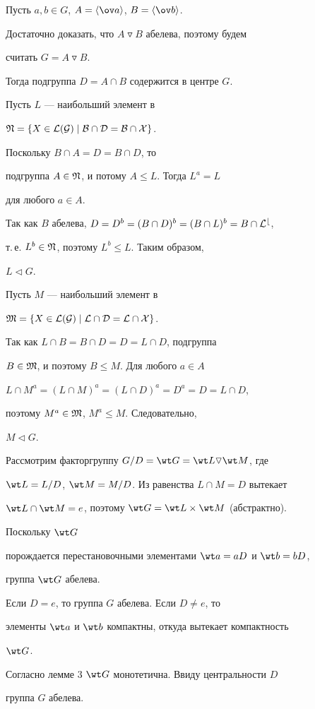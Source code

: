  


\begin{pf} Пусть $a,b\in G$, $A=\la\ov a\ra$, $B=\la\ov b\ra$. 


Достаточно доказать, что $A\triangledown B$ абелева, поэтому будем 


считать $G=A\triangledown B$. 


Тогда подгруппа $D=A\cap B$ содержится в центре $G$. 


Пусть $L$ --- наибольший элемент в 


$\frak N=\{X\in\cal L(G)\mid B\cap D=B\cap X\}$. 


Поскольку $B\cap A=D=B\cap D$, то 


подгруппа $A\in\frak N$, и потому $A\le L$. Тогда $L^a=L$ 


для любого $a\in A$. 


 


Так как $B$ абелева, $D=D^b=(B\cap D)^b=(B\cap L)^b=B\cap\cal L^b$, 


т.\,е. $L^b\in\frak N$, поэтому $L^b\le L$. Таким образом, 


$L\triangleleft G$. 


 


Пусть $M$ --- наибольший элемент в 


$\frak M=\{X\in\cal L(G)\mid L\cap D=L\cap X\}$. 


Так как $L\cap B=B\cap D=D=L\cap D$, подгруппа


$B\in\frak M$, и поэтому $B\le M$. Для любого $a\in A$\; 


$L\cap M^a=(L\cap M)^a=(L\cap D)^a=D^a=D=L\cap D$, 


поэтому $M^a\in\frak M$, $M^a\le M$. Следовательно, 


$M\triangleleft G$. 


 


Рассмотрим факторгруппу $G/D=\wt G=\wt L\triangledown\wt M$, где 


$\wt L=L/D$, $\wt M=M/D$. Из равенства $L\cap M=D$ вытекает 


$\wt L\cap \wt M=e$, поэтому $\wt G=\wt L\times\wt M$ (абстрактно). 


Поскольку $\wt G$ 


порождается перестановочными элементами $\wt a=aD$ и $\wt b=bD$,  


группа $\wt G$ абелева. 


 


Если $D=e$, то группа $G$ абелева. Если $D\ne e$, то  


элементы $\wt a$ и $\wt b$ компактны, откуда вытекает компактность 


$\wt G$. 


Согласно лемме 3\; $\wt G$ монотетична. Ввиду центральности $D$ 


группа $G$ абелева. 


\end{pf} 


